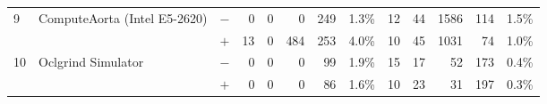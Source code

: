 \begin{tabular}{lll | rrrrr | rrrrr }
\hline
\multirow{ 2}{*}{9} & \multirow{ 2}{*}{ComputeAorta (Intel E5-2620)} & $-$ & 0 & 0 & 0 & 249 & 1.3\%       & 12 & 44 & 1586 & 114 & 1.5\% \\& & $+$ & 13 & 0 & 484 & 253 & 4.0\% & 10 & 45 & 1031 & 74 & 1.0\% \\
\hline
\multirow{ 2}{*}{10} & \multirow{ 2}{*}{Oclgrind Simulator} & $-$ & 0 & 0 & 0 & 99 & 1.9\%       & 15 & 17 & 52 & 173 & 0.4\% \\& & $+$ & 0 & 0 & 0 & 86 & 1.6\% & 10 & 23 & 31 & 197 & 0.3\% \\
  \bottomrule
\end{tabular}

